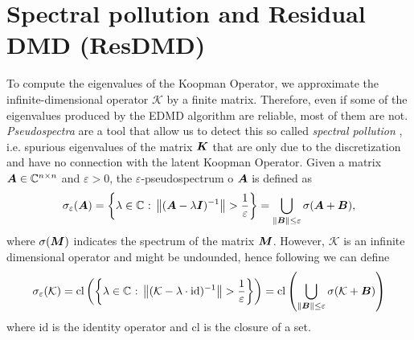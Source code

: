 \section{Spectral pollution and Residual DMD (ResDMD)}
To compute the eigenvalues of the Koopman Operator, we approximate the infinite-dimensional operator $\mathcal{K}$ by a finite matrix. Therefore, even if some of the eigenvalues produced by the EDMD algorithm are reliable, most of them are not. \emph{Pseudospectra} \cite{trefethen_spectra_2005} are a tool that allow us to detect this so called \emph{spectral pollution} \cite{colbrook_rigorous_2021}, i.e. spurious eigenvalues of the matrix $\vb*{K}$ that are only due to the discretization and have no connection with the latent Koopman Operator. Given a matrix $\vb*{A}\in\mathbb{C}^{n\times n}$ and $\varepsilon > 0$, the $\varepsilon$-pseudospectrum o $\vb*{A}$ is defined as
\begin{equation}
    \label{pseudospectrum_matrix_def}
    \sigma_{\varepsilon}(\vb*{A}) = \left\{ \lambda\in\mathbb{C} \text{ : } \norm{(\vb*{A} - \lambda \vb*{I})^{-1}} > \frac{1}{\varepsilon}\right\} = \bigcup_{\norm{\vb*{B}} \leq \varepsilon} \sigma(\vb*{A}+ \vb*{B}),
\end{equation}
where $\sigma(\vb*{M})$ indicates the spectrum of the matrix $\vb*{M}$. However, $\mathcal{K}$ is an infinite dimensional operator and might be undounded, hence following \cite{trefethen_spectra_2005} we can define
\begin{equation}
    \label{pseudospectrum_koopman_def}
    \sigma_{\varepsilon}(\mathcal{K}) = \mathrm{cl}\left( \left\{ \lambda\in\mathbb{C} \text{ : } \norm{(\mathcal{K} - \lambda \cdot \mathrm{id})^{-1}} > \frac{1}{\varepsilon}\right\} \right) = \mathrm{cl}\left( \bigcup_{\norm{\vb*{B}} \leq \varepsilon} \sigma(\mathcal{K}+ \vb*{B}) \right)
\end{equation}
where $\mathrm{id}$ is the identity operator and $\mathrm{cl}$ is the closure of a set.

